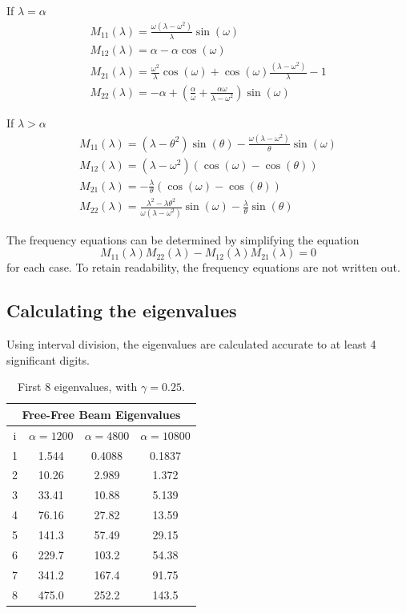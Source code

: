 \documentclass[../../main.tex]{subfiles}
\begin{document}
{If $\lambda = \alpha$}
\begin{align*}
	&M_{11}(\lambda) = \frac{\omega\left(\lambda - \omega^2\right)}{\lambda}\sin(\omega)&\\
	&M_{12}(\lambda)=\alpha-\alpha\cos(\omega)&\\
	&M_{21}(\lambda)=\frac{\omega^2}{\lambda}\cos(\omega)+\cos(\omega)\frac{\left(\lambda - \omega^2\right)}{\lambda} - 1 &\\
	&M_{22}(\lambda)=-\alpha+\left(\frac{\alpha}{\omega}+\frac{\alpha\omega}{\lambda-\omega^2}\right)\sin(\omega)&
\end{align*}

{If $\lambda > \alpha$}
\begin{align*}
	&M_{11}(\lambda) = \left(\lambda - \theta^2\right)\sin(\theta) - \frac{\omega  \left(\lambda - \omega^2\right)}{\theta}\sin(\omega)&\\
	&M_{12}(\lambda) = \left(\lambda - \omega^2\right)(\cos(\omega) - \cos(\theta))&\\
	&M_{21}(\lambda)=-\frac{\lambda}{\theta}(\cos(\omega)-\cos(\theta))&\\
	&M_{22}(\lambda)=\frac{\lambda^2-\lambda\theta^2}{\omega(\lambda-\omega^2)}\sin(\omega)-\frac{\lambda}{\theta}\sin(\theta)&
\end{align*}

The frequency equations can be determined by simplifying the equation $$M_{11}(\lambda)M_{22}(\lambda)-M_{12}(\lambda)M_{21}(\lambda) = 0$$
for each case. To retain readability, the frequency equations are not written out.

\subsection{Calculating the eigenvalues}
Using interval division, the eigenvalues are calculated accurate to at least 4 significant digits.
\FloatBarrier
\begin{table}[htbp]
	\centering
	\caption{First 8 eigenvalues, with $\gamma = 0.25$.}
	\begin{tabular}{|c||c|c|c|}
		\hline
		\multicolumn{4}{|c|}{Free-Free Beam Eigenvalues}\\
		\hline
		{i} & {$\alpha = 1200$} & {$\alpha = 4800$} & {$\alpha = 10800$} \\
		\hline
		1     & 1.544 & 0.4088 & 0.1837 \\
		2     & 10.26 & 2.989 & 1.372 \\
		3     & 33.41 & 10.88 & 5.139 \\
		4     & 76.16 & 27.82 & 13.59 \\
		5     & 141.3 & 57.49 & 29.15 \\
		6     & 229.7 & 103.2 & 54.38 \\
		7     & 341.2 & 167.4 & 91.75 \\
		8     & 475.0   & 252.2 & 143.5 \\
		\hline
	\end{tabular}%
	\label{tab:addlabel}%
\end{table}%
\FloatBarrier
\end{document}
